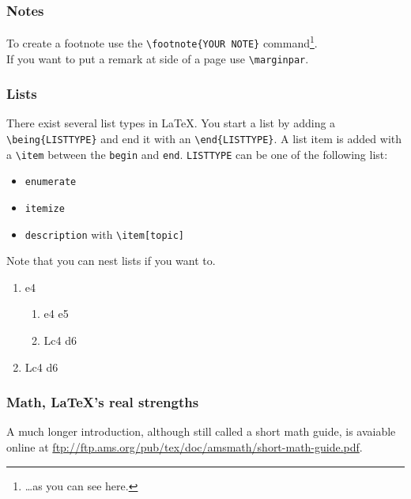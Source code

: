 \documentclass[10pt,a4paper]{scrartcl}
\begin{document}
\subsubsection{Notes}
To create a footnote use the \verb$\footnote{YOUR NOTE}$ 
command\footnote{\dots as you can see here.}. \\
If you want to put a remark at side of a page use \verb$\marginpar$.

\subsubsection{Lists}
There exist several list types in \LaTeX. You start a list by adding a 
\verb$\being{LISTTYPE}$ and end it with an \verb$\end{LISTTYPE}$. A list item
is added with a \verb$\item$ between the \texttt{begin} and \texttt{end}.
\texttt{LISTTYPE} can be one of the following list:
\begin{itemize}
\item \texttt{enumerate}
\item \texttt{itemize}
\item \texttt{description} with \verb$\item[topic]$
\end{itemize}
\noindent Note that you can nest lists if you want to.

\begin{enumerate}
\item{e4} 	
	\begin{enumerate}
	\item{e4}   e5
	\item Lc4 d6
	\end{enumerate}
\item Lc4 d6
\end{enumerate}


\subsubsection{Math, \LaTeX 's real strengths}
A much longer introduction, although still called a short math guide, is 
avaiable online at \url{ftp://ftp.ams.org/pub/tex/doc/amsmath/short-math-guide.pdf}.
\end{document}
